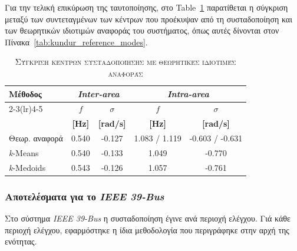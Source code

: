 \documentclass[conference]{IEEEtran}
\begin{document}
Για την τελική επικύρωση της ταυτοποίησης, στο Table~\ref{tab:clustering_comparison_kundur} παρατίθεται η σύγκριση μεταξύ των συντεταγμένων των κέντρων που προέκυψαν από τη συσταδοποίηση και των θεωρητικών ιδιοτιμών αναφοράς του συστήματος, όπως αυτές δίνονται στον Πίνακα~\ref{tab:kundur_reference_modes}. 

\begin{table}[htbp]
\centering
\caption{\textsc{Σύγκριση κέντρων συσταδοποίησης με θεωρητικές ιδιοτιμές αναφοράς}}
\label{tab:clustering_comparison_kundur}
\footnotesize
\setlength{\tabcolsep}{3.5pt}
\renewcommand{\arraystretch}{1.12}
\begin{tabular}{lcccc}
\toprule
\textbf{Μέθοδος} & \multicolumn{2}{c}{\textbf{\textit{Inter-area}}} & \multicolumn{2}{c}{\textbf{\textit{Intra-area}}} \\
\cmidrule(lr){2-3}\cmidrule(lr){4-5}
& \textbf{$f$} & \textbf{$\sigma$} & \textbf{$f$} & \textbf{$\sigma$} \\
& \textbf{[Hz]} & \textbf{[rad/s]} & \textbf{[Hz]} & \textbf{[rad/s]} \\
\midrule
Θεωρ. αναφορά & 0.540 & -0.127 & 1.083 / 1.119 & -0.603 / -0.631 \\
\textit{k}-Means   & 0.540 & -0.133 & 1.049 & -0.770 \\
\textit{k}-Medoids & 0.543 & -0.126 & 1.057 & -0.761 \\
\bottomrule
\end{tabular}
\end{table}

\subsubsection{Αποτελέσματα για το \textit{IEEE 39-Bus}}
Στο σύστημα \textit{IEEE 39-Bus} η συσταδοποίηση έγινε ανά περιοχή ελέγχου. Γιά κάθε περιοχή ελέγχου, εφαρμόστηκε η ίδια μεθοδολογία που περιγράφηκε στην αρχή της ενότητας.
\end{document}
